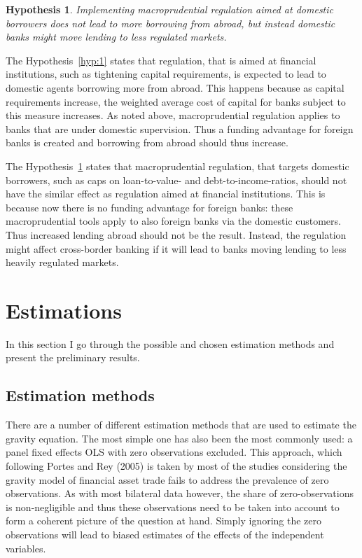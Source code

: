 \documentclass[12pt,a4paper]{article}
\newtheorem{hyp}{Hypothesis}
\begin{document}
\begin{hyp} \label{hyp:2}
Implementing macroprudential regulation aimed at domestic borrowers does not lead to more borrowing from abroad, but instead domestic banks might move lending to less regulated markets.
\end{hyp}

The Hypothesis~\ref{hyp:1} states that regulation, that is aimed at financial institutions, such as tightening capital requirements, is expected to lead to domestic agents borrowing more from abroad. This happens because as capital requirements increase, the weighted average cost of capital for banks subject to this measure increases. As noted above, macroprudential regulation applies to banks that are under domestic supervision. Thus a funding advantage for foreign banks is created and borrowing from abroad should thus increase. 

The Hypothesis~\ref{hyp:2} states that macroprudential regulation, that targets domestic borrowers, such as caps on loan-to-value- and debt-to-income-ratios, should not have the similar effect as regulation aimed at financial institutions. This is because now there is no funding advantage for foreign banks: these macroprudential tools apply to also foreign banks via the domestic customers. Thus increased lending abroad should not be the result. Instead, the regulation might affect cross-border banking if it will lead to banks moving lending to less heavily regulated markets. 

\newpage
\section{Estimations}

In this section I go through the possible and chosen estimation methods and present the preliminary results. 

\subsection{Estimation methods}

There are a number of different estimation methods that are used to estimate the gravity equation. The most simple one has also been the most commonly used: a panel fixed effects OLS with zero observations excluded. This approach, which following Portes and Rey (2005) is taken by most of the studies considering the gravity model of financial asset trade fails to address the prevalence of zero observations. As with most bilateral data however, the share of zero-observations is non-negligible and thus these observations need to be taken into account to form a coherent picture of the question at hand. Simply ignoring the zero observations will lead to biased estimates of the effects of the independent variables. 
\end{document}
